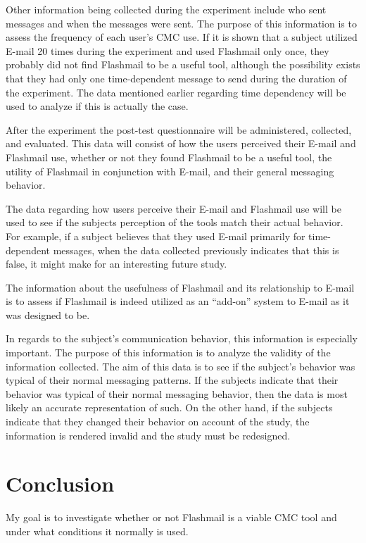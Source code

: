 Other information being collected during the experiment include who sent
messages and when the messages were sent.  The purpose of this information
is to assess the frequency of each user's CMC use.  If it is shown that a
subject utilized E-mail 20 times during the experiment and used Flashmail only
once, they probably did not find Flashmail to be a useful tool, although
the possibility exists that they had only one time-dependent message to
send during the duration of the experiment.  The data mentioned earlier
regarding time dependency will be used to analyze if this is actually the
case.

After the experiment the post-test questionnaire will be administered,
collected, and evaluated.  This data will consist of how the users
perceived their E-mail and Flashmail use, whether or not they found
Flashmail to be a useful tool, the utility of Flashmail in conjunction with
E-mail, and their general messaging behavior.

The data regarding how users perceive their E-mail and Flashmail use will
be used to see if the subjects perception of the tools match their actual
behavior.  For example, if a subject believes that they used E-mail
primarily for time-dependent messages, when the data collected previously
indicates that this is false, it might make for an interesting future
study. 

The information about the usefulness of Flashmail and its relationship to
E-mail is to assess if Flashmail is indeed utilized as an ``add-on'' system
to E-mail as it was designed to be.

In regards to the subject's communication behavior, this information is
especially important.  The purpose of this information is to analyze the
validity of the information collected.  The aim of this data is to see if
the subject's behavior was typical of their normal messaging patterns.  If
the subjects indicate that their behavior was typical of their normal
messaging behavior, then the data is most likely an accurate representation
of such.  On the other hand, if the subjects indicate that they changed
their behavior on account of the study, the information is rendered invalid
and the study must be redesigned.


\chapter{Conclusion}
My goal is to investigate whether or not Flashmail is a viable CMC tool and
under what conditions it normally is used.

